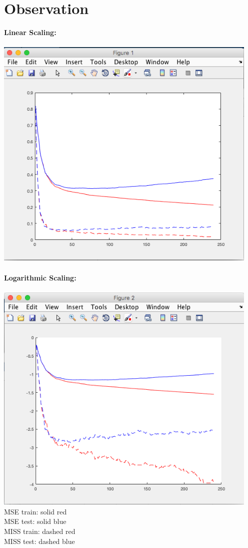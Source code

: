 \documentclass[a4paper]{article}
\begin{document}
\section*{Observation}
\textbf{Linear Scaling:}\\\\
\includegraphics[width=5in]{LinearScaling.png}\\\\
\textbf{Logarithmic Scaling:}\\\\
\includegraphics[width=5in]{LogScaling.png}\\
MSE train: solid red\\
MSE test: solid blue\\
MISS train: dashed red\\
MISS test: dashed blue\\
\end{document}
